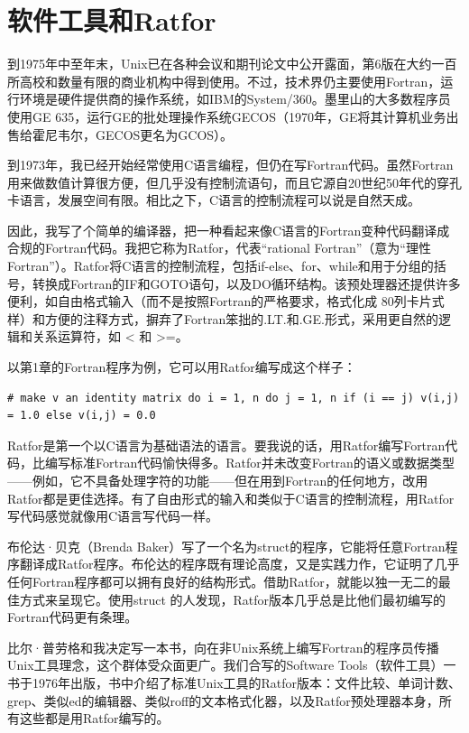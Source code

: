 \documentclass[a4paper,12pt,UTF8,twoside]{ctexbook}
\begin{document}
\section{软件工具和Ratfor}

到1975年中至年末，Unix已在各种会议和期刊论文中公开露面，第6版在大约一百所高校和数量有限的商业机构中得到使用。不过，技术界仍主要使用Fortran，运行环境是硬件提供商的操作系统，如IBM的System/360。墨里山的大多数程序员使用GE 635，运行GE的批处理操作系统GECOS（1970年，GE将其计算机业务出售给霍尼韦尔，GECOS更名为GCOS）。

到1973年，我已经开始经常使用C语言编程，但仍在写Fortran代码。虽然Fortran用来做数值计算很方便，但几乎没有控制流语句，而且它源自20世纪50年代的穿孔卡语言，发展空间有限。相比之下，C语言的控制流程可以说是自然天成。

因此，我写了个简单的编译器，把一种看起来像C语言的Fortran变种代码翻译成合规的Fortran代码。我把它称为Ratfor，代表“rational Fortran”（意为“理性Fortran”）。Ratfor将C语言的控制流程，包括if-else、for、while和用于分组的括号，转换成Fortran的IF和GOTO语句，以及DO循环结构。该预处理器还提供许多便利，如自由格式输入（而不是按照Fortran的严格要求，格式化成 80列卡片式样）和方便的注释方式，摒弃了Fortran笨拙的.LT.和.GE.形式，采用更自然的逻辑和关系运算符，如 < 和 >=。

以第1章的Fortran程序为例，它可以用Ratfor编写成这个样子：

\begin{lstlisting}
# make v an identity matrix do i = 1, n do j = 1, n if (i == j) v(i,j) = 1.0 else v(i,j) = 0.0
\end{lstlisting}

Ratfor是第一个以C语言为基础语法的语言。要我说的话，用Ratfor编写Fortran代码，比编写标准Fortran代码愉快得多。Ratfor并未改变Fortran的语义或数据类型——例如，它不具备处理字符的功能——但在用到Fortran的任何地方，改用Ratfor都是更佳选择。有了自由形式的输入和类似于C语言的控制流程，用Ratfor写代码感觉就像用C语言写代码一样。

布伦达·贝克（Brenda Baker）写了一个名为struct的程序，它能将任意Fortran程序翻译成Ratfor程序。布伦达的程序既有理论高度，又是实践力作，它证明了几乎任何Fortran程序都可以拥有良好的结构形式。借助Ratfor，就能以独一无二的最佳方式来呈现它。使用struct 的人发现，Ratfor版本几乎总是比他们最初编写的Fortran代码更有条理。

比尔·普劳格和我决定写一本书，向在非Unix系统上编写Fortran的程序员传播Unix工具理念，这个群体受众面更广。我们合写的Software Tools（软件工具）一书于1976年出版，书中介绍了标准Unix工具的Ratfor版本：文件比较、单词计数、grep、类似ed的编辑器、类似roff的文本格式化器，以及Ratfor预处理器本身，所有这些都是用Ratfor编写的。
\end{document}
